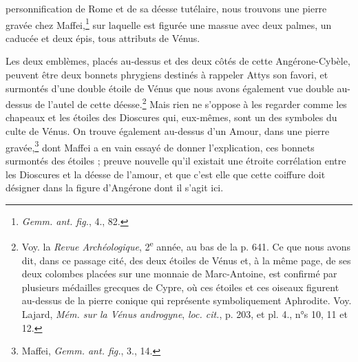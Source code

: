 \documentclass[a4paper, 11pt, oneside, polutonikogreek, french]{article}
\begin{document}
personnification de Rome et de sa déesse tutélaire, nous trouvons une pierre gravée chez Maffei,\footnote{\emph{Gemm. ant. fig.}, 4., 82.} sur laquelle est figurée une massue avec deux palmes, un caducée et deux épis, tous attributs de Vénus.

Les deux emblèmes, placés au-dessus et des deux côtés de cette Angérone-Cybèle, peuvent être deux bonnets phrygiens destinés à rappeler Attys son favori, et surmontés d'une double étoile de Vénus que nous avons également vue double au-dessus de l'autel de cette déesse.\footnote{Voy. la \emph{Revue Archéologique}, 2\textsuperscript{e} année, au bas de la p. 641. Ce que nous avons dit, dans ce passage cité, des deux étoiles de Vénus et, à la même page, de ses deux colombes placées sur une monnaie de Marc-Antoine, est confirmé par plusieurs médailles grecques de Cypre, où ces étoiles et ces oiseaux figurent au-dessus de la pierre conique qui représente symboliquement Aphrodite. Voy. Lajard, \emph{Mém. sur la Vénus androgyne}, \emph{loc. cit.}, p. 203, et pl. 4., n°s 10, 11 et 12.} Mais rien ne s'oppose à les regarder comme les chapeaux et les étoiles des Dioscures qui, eux-mêmes, sont un des symboles du culte de Vénus. On trouve également au-dessus d'un Amour, dans une pierre gravée,\footnote{Maffei, \emph{Gemm. ant. fig.}, 3., 14.} dont Maffei a en vain essayé de donner l'explication, ces bonnets surmontés des étoiles ; preuve nouvelle qu'il existait une étroite corrélation entre les Dioscures et la déesse de l'amour, et que c'est elle que cette coiffure doit désigner dans la figure d'Angérone dont il s'agit ici.
\end{document}
